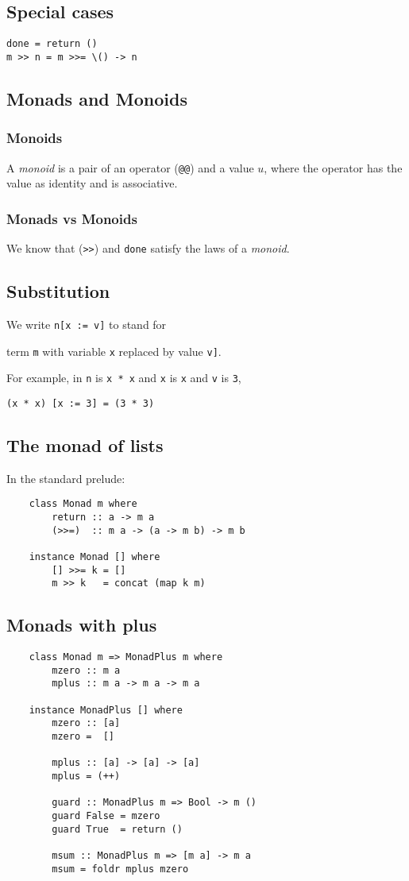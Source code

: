 \documentclass{article}
\begin{document}
\subsection{Special cases}
\begin{verbatim}
done = return ()
m >> n = m >>= \() -> n
\end{verbatim}
\subsection{Monads and Monoids}
\subsubsection{Monoids}
A \emph{monoid} is a pair of an operator (\texttt{@@}) and a value $u$, where the operator has the value as identity and is associative.
\subsubsection{Monads vs Monoids}
We know that (\texttt{>>}) and \texttt{done} satisfy the laws of a \emph{monoid}.
\subsection{Substitution}
We write \texttt{n[x := v]} to stand for
\begin{center}
	term \texttt{m} with variable \texttt{x} replaced by value \texttt{v]}.
\end{center}
For example, in \texttt{n} is \texttt{x * x} and \texttt{x} is \texttt{x} and \texttt{v} is \texttt{3},
\begin{center}
	\texttt{(x * x) [x := 3] = (3 * 3)}
\end{center}
\subsection{The monad of lists}
In the standard prelude:
\begin{verbatim}
    class Monad m where
        return :: a -> m a
        (>>=)  :: m a -> (a -> m b) -> m b
    
    instance Monad [] where
        [] >>= k = []
        m >> k   = concat (map k m)
\end{verbatim}
\subsection{Monads with plus}
\begin{verbatim}
    class Monad m => MonadPlus m where
        mzero :: m a
        mplus :: m a -> m a -> m a
    
    instance MonadPlus [] where
        mzero :: [a]
        mzero =  []

        mplus :: [a] -> [a] -> [a]
        mplus = (++)

        guard :: MonadPlus m => Bool -> m ()
        guard False = mzero
        guard True  = return ()

        msum :: MonadPlus m => [m a] -> m a
        msum = foldr mplus mzero
\end{verbatim}
\end{document}
